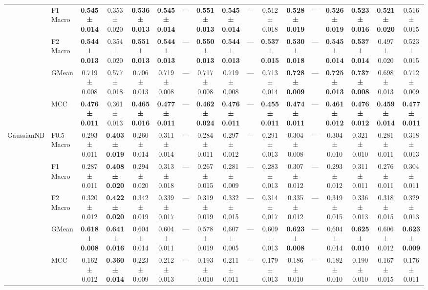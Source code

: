 \begin{table}[H]
{\begin{tabular}{llccccccccccccccc}
 & F1 Macro & \textbf{0.545 ± 0.014} & 0.353 ± 0.020 & \textbf{0.536 ± 0.013} & \textbf{0.545 ± 0.014} & — & \textbf{0.551 ± 0.013} & \textbf{0.545 ± 0.014} & — & 0.512 ± 0.018 & \textbf{0.528 ± 0.019} & — & \textbf{0.526 ± 0.019} & \textbf{0.523 ± 0.016} & \textbf{0.521 ± 0.020} & 0.516 ± 0.015 \\
 & F2 Macro & \textbf{0.544 ± 0.013} & 0.354 ± 0.020 & \textbf{0.551 ± 0.013} & \textbf{0.544 ± 0.013} & — & \textbf{0.550 ± 0.013} & \textbf{0.544 ± 0.013} & — & \textbf{0.537 ± 0.015} & \textbf{0.530 ± 0.018} & — & \textbf{0.545 ± 0.014} & \textbf{0.537 ± 0.014} & 0.497 ± 0.020 & 0.523 ± 0.015 \\
 & GMean & 0.719 ± 0.008 & 0.577 ± 0.018 & 0.706 ± 0.013 & 0.719 ± 0.008 & — & 0.717 ± 0.008 & 0.719 ± 0.008 & — & 0.713 ± 0.014 & \textbf{0.728 ± 0.009} & — & \textbf{0.725 ± 0.013} & \textbf{0.737 ± 0.008} & 0.698 ± 0.013 & 0.712 ± 0.009 \\
 & MCC & \textbf{0.476 ± 0.011} & 0.361 ± 0.013 & \textbf{0.465 ± 0.016} & \textbf{0.477 ± 0.011} & — & \textbf{0.462 ± 0.024} & \textbf{0.476 ± 0.011} & — & \textbf{0.455 ± 0.011} & \textbf{0.474 ± 0.011} & — & \textbf{0.461 ± 0.012} & \textbf{0.476 ± 0.012} & \textbf{0.459 ± 0.014} & \textbf{0.477 ± 0.011} \\
\cline{1-17}
\multirow[t]{5}{*}{GaussianNB} & F0.5 Macro & 0.293 ± 0.011 & \textbf{0.403 ± 0.019} & 0.260 ± 0.014 & 0.311 ± 0.014 & — & 0.284 ± 0.011 & 0.297 ± 0.012 & — & 0.291 ± 0.013 & 0.304 ± 0.008 & — & 0.304 ± 0.010 & 0.321 ± 0.010 & 0.281 ± 0.011 & 0.318 ± 0.013 \\
 & F1 Macro & 0.287 ± 0.011 & \textbf{0.408 ± 0.020} & 0.294 ± 0.020 & 0.313 ± 0.018 & — & 0.267 ± 0.015 & 0.281 ± 0.009 & — & 0.283 ± 0.013 & 0.307 ± 0.012 & — & 0.293 ± 0.012 & 0.311 ± 0.011 & 0.276 ± 0.011 & 0.304 ± 0.011 \\
 & F2 Macro & 0.320 ± 0.012 & \textbf{0.422 ± 0.020} & 0.342 ± 0.019 & 0.339 ± 0.017 & — & 0.319 ± 0.019 & 0.332 ± 0.015 & — & 0.314 ± 0.017 & 0.335 ± 0.012 & — & 0.319 ± 0.015 & 0.336 ± 0.013 & 0.318 ± 0.015 & 0.329 ± 0.013 \\
 & GMean & \textbf{0.618 ± 0.008} & \textbf{0.641 ± 0.016} & 0.604 ± 0.014 & 0.604 ± 0.011 & — & 0.578 ± 0.019 & 0.607 ± 0.005 & — & 0.609 ± 0.013 & \textbf{0.623 ± 0.008} & — & 0.604 ± 0.014 & \textbf{0.625 ± 0.010} & 0.606 ± 0.012 & \textbf{0.623 ± 0.009} \\
 & MCC & 0.162 ± 0.012 & \textbf{0.360 ± 0.014} & 0.223 ± 0.009 & 0.212 ± 0.013 & — & 0.193 ± 0.010 & 0.211 ± 0.011 & — & 0.179 ± 0.013 & 0.186 ± 0.010 & — & 0.182 ± 0.010 & 0.190 ± 0.010 & 0.167 ± 0.015 & 0.176 ± 0.011 \\

\end{tabular}}
\end{table}
